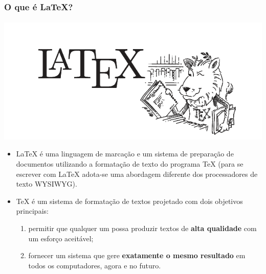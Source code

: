 \begin{frame}
\frametitle{O que é \LaTeX{}?}
\framesubtitle{}
\includegraphics[width=0.5\linewidth]{figures/lion01.png}
\begin{itemize}
  \item \LaTeX{} é uma linguagem de marcação e um sistema de preparação de documentos utilizando a formatação de texto do programa \TeX{} (para se escrever com \LaTeX{} adota-se uma abordagem diferente dos processadores de texto WYSIWYG).
  \item \TeX{} é um sistema de formatação de textos projetado com dois objetivos principais:
  \begin{enumerate}
      \item permitir que qualquer um possa produzir textos de \textbf{alta qualidade} com um esforço aceitável;
      \item fornecer um sistema que gere \textbf{exatamente o mesmo resultado} em todos os computadores, agora e no futuro.
  \end{enumerate}
\end{itemize}
\end{frame}


